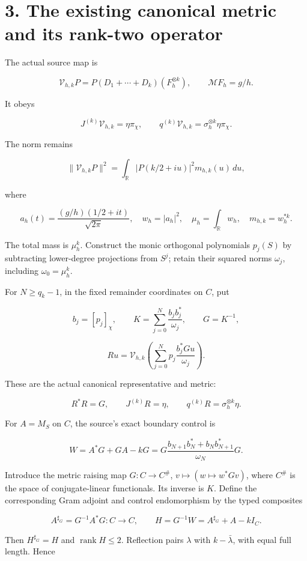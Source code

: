 \documentclass[
  11pt,
]{article}
\begin{document}
\section{3. The existing canonical metric and its rank-two
operator}\label{the-existing-canonical-metric-and-its-rank-two-operator}

The actual source map is

\[
\mathcal V_{h,k}P=P(D_1+\cdots+D_k)(F_h^{\otimes k}),
\qquad \mathcal MF_h=g/h.
\]

It obeys

\[
J^{(k)}\mathcal V_{h,k}=\eta\pi_\chi,
\qquad
q^{(k)}\mathcal V_{h,k}=\sigma_h^{\otimes k}\eta\pi_\chi.
\]

The norm remains

\[
\|\mathcal V_{h,k}P\|^2
=\int_{\mathbb R}|P(k/2+iu)|^2m_{h,k}(u)\,du,
\]

where

\[
a_h(t)=\frac{(g/h)(1/2+it)}{\sqrt{2\pi}},
\quad w_h=|a_h|^2,
\quad\mu_h=\int_{\mathbb R}w_h,
\quad m_{h,k}=w_h^{*k}.
\]

The total mass is \(\mu_h^k\). Construct the monic orthogonal
polynomials \(p_j(S)\) by subtracting lower-degree projections from
\(S^j\); retain their squared norms \(\omega_j\), including
\(\omega_0=\mu_h^k\).

For \(N\geq q_k-1\), in the fixed remainder coordinates on \(C\), put

\[
b_j=[p_j]_\chi,\qquad
K=\sum_{j=0}^{N}\frac{b_jb_j^*}{\omega_j},\qquad G=K^{-1},
\]

\[
R u=\mathcal V_{h,k}
\left(\sum_{j=0}^{N}p_j\frac{b_j^*Gu}{\omega_j}\right).
\]

These are the actual canonical representative and metric:

\[
R^*R=G,\qquad J^{(k)}R=\eta,\qquad
q^{(k)}R=\sigma_h^{\otimes k}\eta.
\]

For \(A=M_S\) on \(C\), the source's exact boundary control is

\[
\boxed{
W=A^*G+GA-kG
=G\frac{b_{N+1}b_N^*+b_Nb_{N+1}^*}{\omega_N}G.
}
\]

Introduce the metric raising map \(G:C\to C^\#\),
\(v\mapsto(w\mapsto w^*Gv)\), where \(C^\#\) is the space of
conjugate-linear functionals. Its inverse is \(K\). Define the
corresponding Gram adjoint and control endomorphism by the typed
composites

\[
A^{\sharp_G}=G^{-1}A^*G:C\to C,
\qquad
H=G^{-1}W=A^{\sharp_G}+A-kI_C.
\]

Then \(H^{\sharp_G}=H\) and \(\operatorname{rank}H\leq2\). Reflection
pairs \(\lambda\) with \(k-\bar\lambda\), with equal full length. Hence
\end{document}
